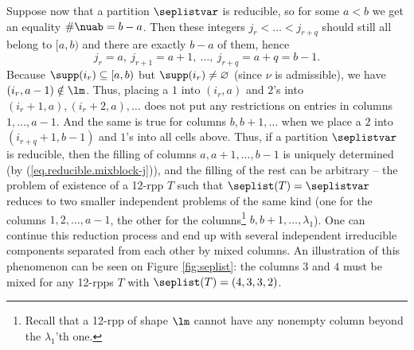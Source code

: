 \documentclass[numbers=enddot,12pt,final,onecolumn,notitlepage]{scrartcl}%
\theoremstyle{definition}
\begin{document}
Suppose now that a partition $\seplistvar$ is reducible, so for some $a<b$ we get an equality $\#\nuab=b-a$. Then these integers $j_r<\dots<j_{r+q}$ should still all belong to $[a,b)$ and there are exactly $b-a$ of them, hence 
\begin{equation}
j_r=a,\ j_{r+1}=a+1,\ \dots,\ j_{r+q}=a+q=b-1 .
\label{eq.reducible.mixblock-j}
\end{equation}
Because $\supp(i_r)\subseteq[a,b)$ but $\supp(i_r)\neq\varnothing$ (since $\nu$ is admissible), we have $(i_r,a-1)\notin\lm$. Thus, placing a $1$ into $(i_r,a)$ and $2$'s into $(i_r+1,a),(i_r+2,a),\dots$ does not put any restrictions on entries in columns $1,\dots, a-1$. And the same is true for columns $b,b+1,\dots$ when we place a $2$ into $(i_{r+q}+1,b-1)$ and $1$'s into all cells above. Thus, if a partition $\seplistvar$ is reducible, then the filling of columns $a,a+1,\dots, b-1$ is uniquely determined (by (\ref{eq.reducible.mixblock-j})), and the filling of the rest can be arbitrary -- the problem of existence of a 12-rpp $T$ such that $\seplist(T)=\seplistvar$ reduces to two smaller independent problems of the same kind (one for the columns $1,2,\ldots,a-1$, the other for the columns\footnote{Recall that a 12-rpp of shape $\lm$ cannot have any nonempty column beyond the $\lambda_1$'th one.} $b,b+1,\ldots,\lambda_1$). One can continue this reduction process and end up with several independent irreducible components separated from each other by mixed columns. An illustration of this phenomenon can be seen on Figure \ref{fig:seplist}: the columns $3$ and $4$ must be mixed for any 12-rpps $T$ with $\seplist(T)=(4,3,3,2)$.
\end{document}
